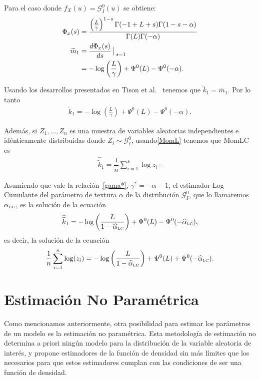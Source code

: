 Para el caso donde $f_X(u) = \mathcal{G}_I^0(u)$ se obtiene:
	\begin{align}
	\Phi_x(s) &= \dfrac{\left(\frac{L}{\gamma}\right)^{1-s}\Gamma(-1+L+s)\Gamma(1-s-\alpha)}{\Gamma(L)\Gamma(-\alpha)} \\
	\vspace{1cm}
	\nonumber \widetilde{m}_1 &=  \frac{d \Phi_x(s)}{ds } \big\arrowvert _{s=1}\\
					& = -\log\left(\frac{L}{\gamma}\right) + \Psi^0(L) - \Psi^0(-\alpha).
	\end{align}

Usando los desarrollos presentados en Tison et al.~\cite{Tison2004} tenemos que $\widetilde{k}_1 = \widetilde{m_1}$. Por lo tanto 
\begin{align}
\label{MomLC}
\widetilde{k}_1 =   -\log \left(\frac{L}{\gamma}\right) + \Psi^0(L) - \Psi^0(-\alpha).
\end{align}

Además, si $Z_1,\ldots,Z_n$ es una muestra de variables aleatorias independientes e idénticamente distribuidas donde $Z_i \sim \mathcal{G}_I^0$, usando\eqref{MomL} tenemos que MomLC es
\begin{align}
\label{EstimadorMomLC}
\widehat{\widetilde{k}}_1 =\dfrac{1}{n} \sum_{i=1}^k\log z_i\cdot
\end{align}

Asumiendo que vale la relación~\eqref{gama*}, $\gamma^*=-\alpha-1$, el estimador Log Cumulante del parámetro de textura $\alpha$ de la distribución $\mathcal{G}_I^0$, que lo llamaremos $\alpha_{\text{\tiny{LC}}}$, es la solución de la ecuación    
\begin{align}
\widehat{\widetilde{k}}_1 =   -\log \left(\frac{L}{1-\widehat\alpha_{\text{\tiny{LC}}}}\right) + \Psi^0(L) - \Psi^0(-\widehat\alpha_{\text{\tiny{LC}}}),
\end{align}
es decir, la solución de la ecuación
\begin{equation} \label{eq:logm}
\frac{1}{n} \sum_{i=1}^n\log (z_i) =   -\log \left(\frac{L}{1-\widehat\alpha_{\text{\tiny{LC}}}}\right) + \Psi^0(L) + \Psi^0(-\widehat\alpha_{\text{\tiny{LC}}}).
\end{equation}


\section{Estimación No Paramétrica}

Como mencionamos anteriormente, otra posibilidad para estimar los parámetros de un modelo es la estimación no paramétrica. Esta metodología de estimación  no determina a priori ningún modelo para la distribución de la variable aleatoria de interés, y propone estimadores de la función de densidad sin más límites que los necesarios para que estos estimadores cumplan con las condiciones de ser una función de densidad.

